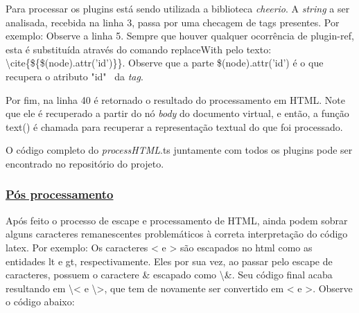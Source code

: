 
Para processar os plugins está sendo utilizada a biblioteca \textit{cheerio}.
A \textit{string} a ser analisada, recebida na linha 3, passa por uma checagem de
tags presentes. Por exemplo: Observe a linha 5. Sempre que houver
qualquer ocorrência de plugin-ref, esta é substituída através do
comando replaceWith pelo texto:
\textbackslash cite\{\$\{\$(node).attr('id')\}\}.
Observe que a parte \$(node).attr('id')
é o que recupera o atributo "id"~  da \textit{tag}.

\begin{processHTML}
import * as cheerio from 'cheerio';

export function processHTML(text: string): string{
    const $ = cheerio.load(text);
    $('plugin-ref').replaceWith((_, node) => {
        return `\\cite{${$(node).attr('id')}}`;
    }); [...]
\end{processHTML}

Por fim, na linha 40 é retornado o resultado do processamento
em HTML. Note que ele é recuperado a partir do nó \textit{body} do documento
virtual, e então, a função text() é chamada para recuperar a
representação textual do que foi processado.

\begin{processHTML2}
[...]
    return $('body').text();
}
\end{processHTML2}

O código completo do \textit{processHTML}.ts juntamente com
todos os plugins pode ser encontrado no repositório do projeto.

\subsubsection{\underline{Pós processamento}}

Após feito o processo de escape e processamento de HTML, ainda podem
sobrar alguns caracteres remanescentes problemáticos à correta
interpretação do código
\acrshort{latex}.
Por exemplo: Os caracteres < e > são escapados no
\acrshort{html}
como as entidades lt e gt, respectivamente. Eles por sua vez,
ao passar pelo escape de caracteres, possuem o caractere
\& escapado como \textbackslash \&. Seu código final acaba resultando em
\textbackslash < e \textbackslash >, que tem de novamente ser convertido em
< e >.
Observe o código abaixo:


